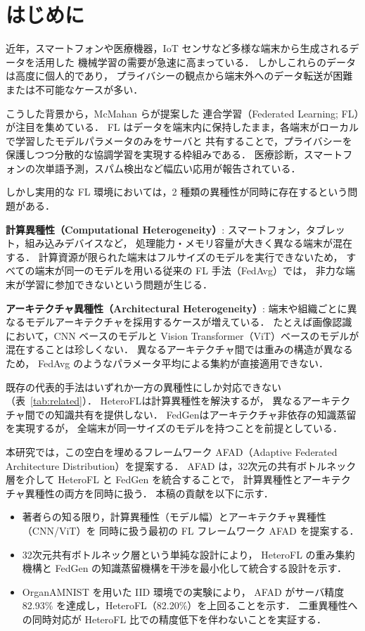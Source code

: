 \section{はじめに}

近年，スマートフォンや医療機器，IoT センサなど多様な端末から生成されるデータを活用した
機械学習の需要が急速に高まっている．
しかしこれらのデータは高度に個人的であり，
プライバシーの観点から端末外へのデータ転送が困難または不可能なケースが多い．

こうした背景から，McMahan ら\cite{McMahanFedAvg}が提案した
連合学習（Federated Learning; FL）が注目を集めている．
FL はデータを端末内に保持したまま，各端末がローカルで学習したモデルパラメータのみをサーバと
共有することで，プライバシーを保護しつつ分散的な協調学習を実現する枠組みである．
医療診断，スマートフォンの次単語予測，スパム検出など幅広い応用が報告されている．

しかし実用的な FL 環境においては，2 種類の異種性が同時に存在するという問題がある．

\textbf{計算異種性（Computational Heterogeneity）}:
スマートフォン，タブレット，組み込みデバイスなど，
処理能力・メモリ容量が大きく異なる端末が混在する．
計算資源が限られた端末はフルサイズのモデルを実行できないため，
すべての端末が同一のモデルを用いる従来の FL 手法（FedAvg\cite{McMahanFedAvg}）では，
非力な端末が学習に参加できないという問題が生じる．

\textbf{アーキテクチャ異種性（Architectural Heterogeneity）}:
端末や組織ごとに異なるモデルアーキテクチャを採用するケースが増えている．
たとえば画像認識において，CNN ベースのモデルと
Vision Transformer（ViT）\cite{VisionTransformer}ベースのモデルが混在することは珍しくない．
異なるアーキテクチャ間では重みの構造が異なるため，
FedAvg のようなパラメータ平均による集約が直接適用できない．

既存の代表的手法はいずれか一方の異種性にしか対応できない（表~\ref{tab:related}）．
HeteroFL\cite{HeteroFL}は計算異種性を解決するが，
異なるアーキテクチャ間での知識共有を提供しない．
FedGen\cite{FedGen}はアーキテクチャ非依存の知識蒸留を実現するが，
全端末が同一サイズのモデルを持つことを前提としている．

本研究では，この空白を埋めるフレームワーク
AFAD（Adaptive Federated Architecture Distribution）を提案する．
AFAD は，32次元の共有ボトルネック層を介して HeteroFL と FedGen を統合することで，
計算異種性とアーキテクチャ異種性の両方を同時に扱う．
本稿の貢献を以下に示す．

\begin{itemize}
  \item 著者らの知る限り，計算異種性（モデル幅）とアーキテクチャ異種性（CNN/ViT）を
        同時に扱う最初の FL フレームワーク AFAD を提案する．
  \item 32次元共有ボトルネック層という単純な設計により，
        HeteroFL の重み集約機構と FedGen の知識蒸留機構を干渉を最小化して統合する設計を示す．
  \item OrganAMNIST を用いた IID 環境での実験により，
        AFAD がサーバ精度 82.93\% を達成し，HeteroFL（82.20\%）を上回ることを示す．
        二重異種性への同時対応が HeteroFL 比での精度低下を伴わないことを実証する．
\end{itemize}

